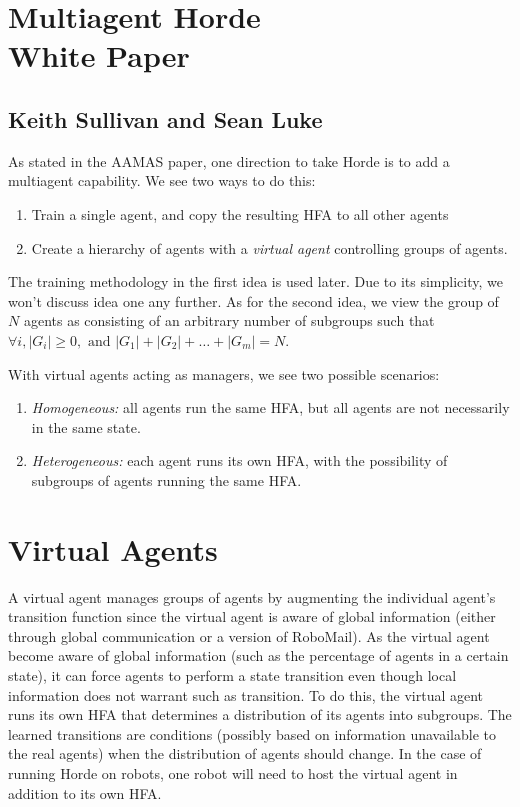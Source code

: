 \documentclass[11pt]{article}
\begin{document}
\section*{Multiagent Horde \\ {\large White Paper} }

\subsection*{Keith Sullivan and Sean Luke} 

As stated in the AAMAS paper, one direction to take Horde is to add a multiagent capability.   We see two ways to do this: 
\begin{enumerate} 
\item Train a single agent, and copy the resulting HFA to all other agents 
\item Create a hierarchy of agents with a \textit{virtual agent} controlling groups of agents. 
\end{enumerate}  

The training methodology in the first idea is used later.  Due to its simplicity, we won't discuss idea one any further.   As for the second idea, we view the group of $N$ agents as consisting of an arbitrary number of subgroups such that $\forall i, |G_i| \ge 0, \text{ and }|G_1| + |G_2| + \ldots + |G_m| = N$.    

With virtual agents acting as managers, we see two possible scenarios: 
\begin{enumerate} 
\item \textit{Homogeneous:}  all agents run the same HFA, but all agents are not necessarily in the same state.  
\item \textit{Heterogeneous:} each agent runs its own HFA, with the possibility of subgroups of agents running the same HFA.  
\end{enumerate}


\section*{Virtual Agents} 
A virtual agent manages groups of agents by augmenting the individual agent's transition function since the virtual agent is aware of global information (either through global communication or a version of RoboMail).   As the virtual agent become aware of global information (such as the percentage of agents in a certain state), it can force agents to perform a state transition even though local information does not warrant such as transition.  To do this,  the virtual agent runs its own HFA that determines a distribution of its agents into subgroups.  The learned transitions are conditions (possibly based on information unavailable to the real agents) when the distribution of agents should change.  In the case of running Horde on robots, one robot will need to host the virtual agent in addition to its own HFA.    
\end{document}
